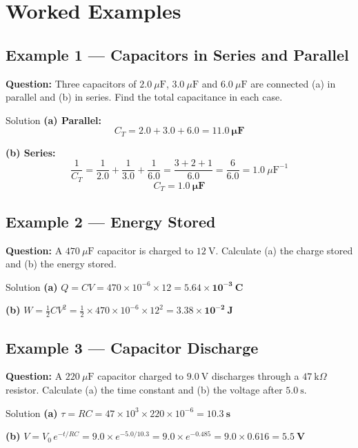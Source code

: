 \section{Worked Examples}

\subsection*{Example 1 — Capacitors in Series and Parallel}

\textbf{Question:} Three capacitors of $2.0\ \mu\text{F}$, $3.0\ \mu\text{F}$ and $6.0\ \mu\text{F}$ are connected (a) in parallel and (b) in series. Find the total capacitance in each case.

\begin{examplebox}{Solution}
\textbf{(a) Parallel:}
$$C_T = 2.0 + 3.0 + 6.0 = \mathbf{11.0\ \mu\text{F}}$$

\textbf{(b) Series:}
$$\frac{1}{C_T} = \frac{1}{2.0} + \frac{1}{3.0} + \frac{1}{6.0} = \frac{3+2+1}{6.0} = \frac{6}{6.0} = 1.0\ \mu\text{F}^{-1}$$
$$C_T = \mathbf{1.0\ \mu\text{F}}$$
\end{examplebox}

\subsection*{Example 2 — Energy Stored}

\textbf{Question:} A $470\ \mu\text{F}$ capacitor is charged to $12\ \text{V}$. Calculate (a) the charge stored and (b) the energy stored.

\begin{examplebox}{Solution}
\textbf{(a)} \quad $Q = CV = 470\times10^{-6} \times 12 = \mathbf{5.64\times10^{-3}\ \text{C}}$

\textbf{(b)} \quad $W = \tfrac{1}{2}CV^2 = \tfrac{1}{2}\times470\times10^{-6}\times12^2 = \mathbf{3.38\times10^{-2}\ \text{J}}$
\end{examplebox}

\subsection*{Example 3 — Capacitor Discharge}

\textbf{Question:} A $220\ \mu\text{F}$ capacitor charged to $9.0\ \text{V}$ discharges through a $47\ \text{k}\Omega$ resistor. Calculate (a) the time constant and (b) the voltage after $5.0\ \text{s}$.

\begin{examplebox}{Solution}
\textbf{(a)} \quad $\tau = RC = 47\times10^3 \times 220\times10^{-6} = \mathbf{10.3\ \text{s}}$

\textbf{(b)} \quad $V = V_0\,e^{-t/RC} = 9.0 \times e^{-5.0/10.3} = 9.0 \times e^{-0.485} = 9.0 \times 0.616 = \mathbf{5.5\ \text{V}}$
\end{examplebox}

